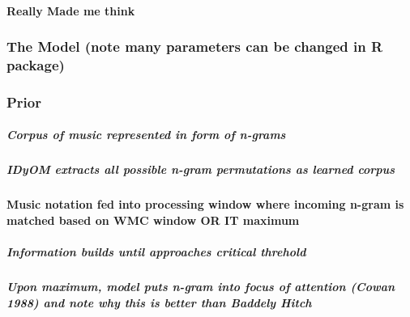 \documentclass[]{book}
\let\oldparagraph\paragraph
\renewcommand{\paragraph}[1]{\oldparagraph{#1}\mbox{}}
\let\oldsubparagraph\subparagraph
\renewcommand{\subparagraph}[1]{\oldsubparagraph{#1}\mbox{}}
\theoremstyle{definition}
\theoremstyle{definition}
\theoremstyle{definition}
\theoremstyle{remark}
\begin{document}
\hypertarget{really-made-me-think}{%
\paragraph{Really Made me think}\label{really-made-me-think}}

\hypertarget{the-model-note-many-parameters-can-be-changed-in-r-package}{%
\subsubsection{The Model (note many parameters can be changed in R
package)}\label{the-model-note-many-parameters-can-be-changed-in-r-package}}

\hypertarget{prior}{%
\subsubsection{Prior}\label{prior}}

\hypertarget{corpus-of-music-represented-in-form-of-n-grams}{%
\subparagraph{Corpus of music represented in form of
n-grams}\label{corpus-of-music-represented-in-form-of-n-grams}}

\hypertarget{idyom-extracts-all-possible-n-gram-permutations-as-learned-corpus}{%
\subparagraph{IDyOM extracts all possible n-gram permutations as learned
corpus}\label{idyom-extracts-all-possible-n-gram-permutations-as-learned-corpus}}

\hypertarget{music-notation-fed-into-processing-window-where-incoming-n-gram-is-matched-based-on-wmc-window-or-it-maximum}{%
\paragraph{Music notation fed into processing window where incoming
n-gram is matched based on WMC window OR IT
maximum}\label{music-notation-fed-into-processing-window-where-incoming-n-gram-is-matched-based-on-wmc-window-or-it-maximum}}

\hypertarget{information-builds-until-approaches-critical-threhold}{%
\subparagraph{Information builds until approaches critical
threhold}\label{information-builds-until-approaches-critical-threhold}}

\hypertarget{upon-maximum-model-puts-n-gram-into-focus-of-attention-cowan-1988-and-note-why-this-is-better-than-baddely-hitch}{%
\subparagraph{Upon maximum, model puts n-gram into focus of attention
(Cowan 1988) and note why this is better than Baddely
Hitch}\label{upon-maximum-model-puts-n-gram-into-focus-of-attention-cowan-1988-and-note-why-this-is-better-than-baddely-hitch}}
\end{document}
